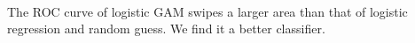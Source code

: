 \documentclass[11pt]{article}
\begin{document}
    \begin{center}
    \end{center}
    { \hspace*{\fill} \\}
    
    The ROC curve of logistic GAM swipes a larger area than that of logistic
regression and random guess. We find it a better classifier.


    
    
    
    
\end{document}
